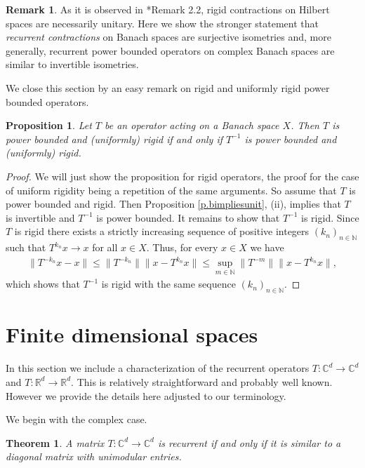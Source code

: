 \documentclass[12pt,leqno]{amsart}
\theoremstyle{plain}
\newtheorem{proposition}[equation]{Proposition}
\newtheorem{theorem}[equation]{Theorem}
\theoremstyle{definition}
\newtheorem{remark}[equation]{Remark}
\numberwithin{equation}{section}
\begin{document}
\begin{remark} As it is observed in \cite{EIS}*{Remark 2.2}, rigid contractions on Hilbert spaces are necessarily unitary. Here we show the stronger statement that \emph{recurrent contractions} on Banach spaces are surjective isometries and, more generally, recurrent power bounded operators on complex Banach spaces are similar to invertible isometries.
\end{remark}

We close this section by an easy remark on rigid and uniformly rigid power bounded operators.

\begin{proposition}\label{p.powerigid} Let $T$ be an operator acting on a Banach space $X$. Then $T$ is power bounded and (uniformly) rigid if and only if $T^{-1}$ is power bounded and (uniformly) rigid.
\end{proposition}

\begin{proof} We will just show the proposition for rigid operators, the proof for the case of uniform rigidity being a repetition of the same arguments. So assume that $T$ is power bounded and rigid. Then Proposition \ref{p.bimpliesunit}, (ii), implies that $T$ is invertible and $T^{-1}$ is power bounded. It remains to show that $T^{-1}$ is rigid. Since $T$ is rigid there exists a strictly increasing sequence of positive integers $(k_n)_{n\in\mathbb N}$ such that $T^{k_n}x\to x$ for all $x\in X$. Thus, for every $x\in X$ we have 
\begin{align*}
 \|T^{-k_n}x-x\|\leq \|T^{-k_n}\| \|x-T^{k_n}x\|\leq \sup_{m\in\mathbb N} \|T^{-m}\| \|x-T^{k_n}x\|,
\end{align*}
which shows that $T^{-1}$ is rigid with the same sequence $(k_n)_{n\in\mathbb N}$.
\end{proof}

\section{Finite dimensional spaces} In this section we include a characterization of the recurrent operators $T:{\mathbb C}^d\to {\mathbb C}^d$ and $T:{\mathbb R}^d\to {\mathbb R}^d$. This is relatively straightforward and probably well known. However we provide the details here adjusted to our terminology.

We begin with the complex case. 

\begin{theorem}
	\label{t.complex} A matrix $T:{\mathbb C}^d\to {\mathbb C}^d$ is recurrent if and only if it is similar to a diagonal matrix with unimodular entries.
\end{theorem}
\end{document}
